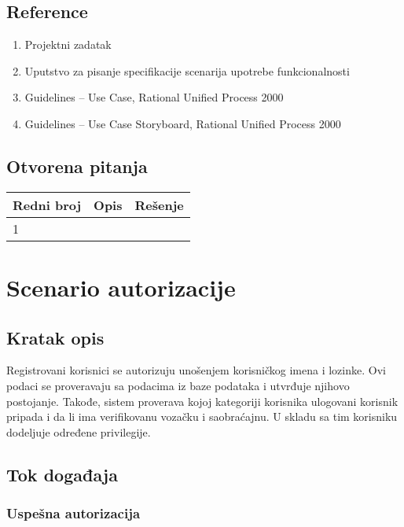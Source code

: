 \documentclass[12pt]{article}
\begin{document}
\subsection{Reference}
\begin{enumerate}
   \item Projektni zadatak
   \item Uputstvo za pisanje specifikacije scenarija upotrebe funkcionalnosti
   \item  Guidelines – Use Case, Rational Unified Process 2000
   \item  Guidelines – Use Case Storyboard, Rational Unified Process 2000
 \end{enumerate}
\subsection{Otvorena pitanja}


\begin{center}
\begin{tabular}{ | m{2cm} | m{7cm}| m{7cm} | } 
\hline
Redni broj& Opis & Rešenje \\ 
\hline
1 &  & \\ 
\hline
\end{tabular}
\end{center}

    

\section{Scenario autorizacije}
\subsection{Kratak opis}
Registrovani korisnici se autorizuju unošenjem korisničkog imena i lozinke. Ovi podaci se proveravaju sa podacima iz baze podataka i utvrđuje njihovo postojanje. 
Takođe, sistem proverava kojoj kategoriji korisnika ulogovani korisnik pripada i da li ima verifikovanu vozačku i saobraćajnu. U
skladu sa tim korisniku dodeljuje određene privilegije.
\subsection{Tok događaja}

\subsubsection{Uspešna autorizacija}
\end{document}
